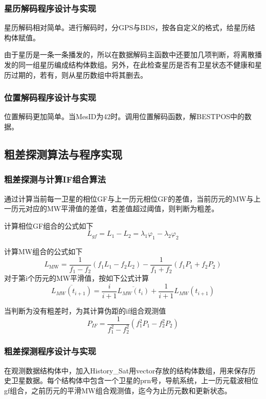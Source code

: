 \documentclass{ctexart}
\begin{document}
\subsubsection{星历解码程序设计与实现}
星历解码相对简单。进行解码时，分GPS与BDS，按各自定义的格式，给星历结构体赋值。

由于星历是一条一条播发的，所以在数据解码主函数中还要加几项判断，将离散播发的同一组星历编成结构体数组。另外，在此检查星历是否有卫星状态不健康和星历过期的，若有，则从星历数组中将其删去。
\subsubsection{位置解码程序设计与实现}
位置解码更加简单。当MesID为42时。调用位置解码函数，解BESTPOS中的数据。

\subsection{粗差探测算法与程序实现}
\subsubsection{粗差探测与计算IF组合算法}
通过计算当前每一卫星的相位GF与上一历元相位GF的差值，当前历元的MW与上一历元对应的MW平滑值的差值，若差值超过阈值，则判断为粗差。

计算相位GF组合的公式如下
\begin{equation}
L_{gf}=L_1-L_2=\lambda_1\varphi_1-\lambda_2\varphi_2
\label{eq:6}
\end{equation}

计算MW组合的公式如下
\begin{equation}
L_{\mathrm{MW}}=\frac{1}{f_{1}-f_{2}}\left(f_{1} L_{1}-f_{2} L_{2}\right)-\frac{1}{f_{1}+f_{2}}\left(f_{1} P_{1}+f_{2} P_{2}\right)
\label{eq:7}
\end{equation}
对于第i个历元的MW平滑值，按如下公式计算
\begin{equation}
\overline{L_{M W}\left(t_{i+1}\right)}=\frac{i}{i+1} \overline{L_{M W}\left(t_{i}\right)}+\frac{1}{i+1} L_{M W}\left(t_{i+1}\right)
\label{eq:8}
\end{equation}

当判断为没有粗差时，为其计算伪距的if组合观测值
\begin{equation}
P_{I F}=\frac{1}{f_{1}^{2}-f_{2}^{2}}\left(f_{1}^{2} P_{1}-f_{2}^{2} P_{2}\right)
\label{eq:9}
\end{equation}

\subsubsection{粗差探测程序设计与实现}
在观测数据结构体中，加入History\_Sat用vector存放的结构体数组，用来保存历史卫星数据。每个结构体中包含一个卫星的prn号，导航系统，上一历元载波相位gf组合，之前历元的平滑MW组合观测值，迄今为止历元数和更新状态。
\end{document}

